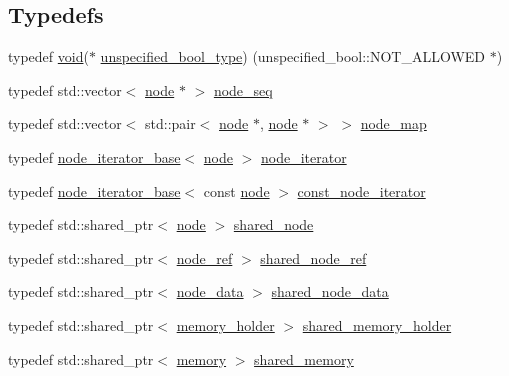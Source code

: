 \subsection*{Typedefs}
\begin{DoxyCompactItemize}
\item 
typedef \mbox{\hyperlink{glad_8h_a950fc91edb4504f62f1c577bf4727c29}{void}}($\ast$ \mbox{\hyperlink{namespace_y_a_m_l_1_1detail_aae838a27553d3f5f39be4723ffcbe90d}{unspecified\+\_\+bool\+\_\+type}}) (unspecified\+\_\+bool\+::\+N\+O\+T\+\_\+\+A\+L\+L\+O\+W\+ED $\ast$)
\item 
typedef std\+::vector$<$ \mbox{\hyperlink{class_y_a_m_l_1_1detail_1_1node}{node}} $\ast$ $>$ \mbox{\hyperlink{namespace_y_a_m_l_1_1detail_a36e15ea9f5f8cbc5299e4d7a26995351}{node\+\_\+seq}}
\item 
typedef std\+::vector$<$ std\+::pair$<$ \mbox{\hyperlink{class_y_a_m_l_1_1detail_1_1node}{node}} $\ast$, \mbox{\hyperlink{class_y_a_m_l_1_1detail_1_1node}{node}} $\ast$ $>$ $>$ \mbox{\hyperlink{namespace_y_a_m_l_1_1detail_aab320a73357e3a299eff450ea378e1b2}{node\+\_\+map}}
\item 
typedef \mbox{\hyperlink{class_y_a_m_l_1_1detail_1_1node__iterator__base}{node\+\_\+iterator\+\_\+base}}$<$ \mbox{\hyperlink{class_y_a_m_l_1_1detail_1_1node}{node}} $>$ \mbox{\hyperlink{namespace_y_a_m_l_1_1detail_aa2a961156810d41a3b6744c10186afac}{node\+\_\+iterator}}
\item 
typedef \mbox{\hyperlink{class_y_a_m_l_1_1detail_1_1node__iterator__base}{node\+\_\+iterator\+\_\+base}}$<$ const \mbox{\hyperlink{class_y_a_m_l_1_1detail_1_1node}{node}} $>$ \mbox{\hyperlink{namespace_y_a_m_l_1_1detail_a049af8e269401cbe1e735033914e4356}{const\+\_\+node\+\_\+iterator}}
\item 
typedef std\+::shared\+\_\+ptr$<$ \mbox{\hyperlink{class_y_a_m_l_1_1detail_1_1node}{node}} $>$ \mbox{\hyperlink{namespace_y_a_m_l_1_1detail_a82d0adac71c8c40ff49ceafad19dda7b}{shared\+\_\+node}}
\item 
typedef std\+::shared\+\_\+ptr$<$ \mbox{\hyperlink{class_y_a_m_l_1_1detail_1_1node__ref}{node\+\_\+ref}} $>$ \mbox{\hyperlink{namespace_y_a_m_l_1_1detail_a1d98768282366a6ddc8ba83938535345}{shared\+\_\+node\+\_\+ref}}
\item 
typedef std\+::shared\+\_\+ptr$<$ \mbox{\hyperlink{class_y_a_m_l_1_1detail_1_1node__data}{node\+\_\+data}} $>$ \mbox{\hyperlink{namespace_y_a_m_l_1_1detail_a1297ce8286b487d590995aab71142019}{shared\+\_\+node\+\_\+data}}
\item 
typedef std\+::shared\+\_\+ptr$<$ \mbox{\hyperlink{class_y_a_m_l_1_1detail_1_1memory__holder}{memory\+\_\+holder}} $>$ \mbox{\hyperlink{namespace_y_a_m_l_1_1detail_a228c4b3b6ba1058b474d40afc218e21d}{shared\+\_\+memory\+\_\+holder}}
\item 
typedef std\+::shared\+\_\+ptr$<$ \mbox{\hyperlink{class_y_a_m_l_1_1detail_1_1memory}{memory}} $>$ \mbox{\hyperlink{namespace_y_a_m_l_1_1detail_ab961bbe6cc8b2322dafbf562feb9f8b4}{shared\+\_\+memory}}
\end{DoxyCompactItemize}
